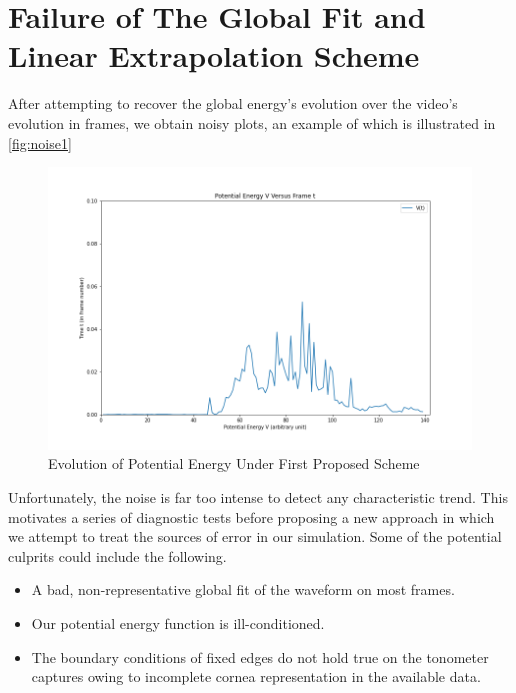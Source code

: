 \documentclass[epjST]{svjour}
\begin{document}
\section{Failure of The Global Fit and Linear Extrapolation Scheme}
After attempting to recover the global energy's evolution over the video's evolution in frames, we obtain noisy plots, an example of which is illustrated in \autoref{fig:noise1}
\begin{figure}[h]
    \centering
    \includegraphics[width=0.8\linewidth]{figures/minimization1/TimeEvolution_up.png}
    \caption{Evolution of Potential Energy Under First Proposed Scheme}
    \label{fig:noise1}
\end{figure}
Unfortunately, the noise is far too intense to detect any characteristic trend. This motivates a series of diagnostic tests before proposing a new approach in which we attempt to treat the sources of error in our simulation. Some of the potential culprits could include the following.
\begin{itemize}
    \item A bad, non-representative global fit of the waveform on most frames.
    \\\item Our potential energy function is ill-conditioned.
    \\\item The boundary conditions of fixed edges do not hold true on the tonometer captures owing to incomplete cornea representation in the available data.
\end{itemize}
\end{document}
